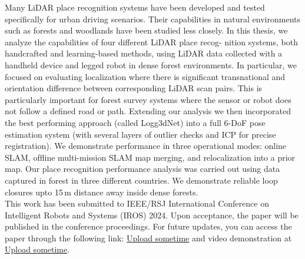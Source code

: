
Many LiDAR place recognition systems have been
developed and tested speciﬁcally for urban driving scenarios.
Their capabilities in natural environments such as forests and
woodlands have been studied less closely. In this thesis, we
analyze the capabilities of four different LiDAR place recog-
nition systems, both handcrafted and learning-based methods,
using LiDAR data collected with a handheld device and legged
robot in dense forest environments. In particular, we focused on
evaluating localization where there is signiﬁcant transnational
and orientation difference between corresponding LiDAR scan
pairs. This is particularly important for forest survey systems
where the sensor or robot does not follow a deﬁned road or
path. 
Extending our analysis we then incorporated the best
performing approach (called Logg3dNet) into a full 6-DoF pose
estimation system (with several layers of outlier checks and
ICP for precise registration). We demonstrate performance in
three operational modes: online SLAM, ofﬂine multi-mission
SLAM map merging, and relocalization into a prior map.
Our place recognition performance analysis was carried out
using data captured in forest in three different countries. We demonstrate reliable loop closures upto 15\,m distance away inside dense forests.  \\

This work has been submitted to IEEE/RSJ International Conference on Intelligent Robots and Systems (IROS) 2024. Upon acceptance, the paper will be published in the conference proceedings. For future updates, you can access the paper through the following link: \url{Upload sometime} and video demonstration at \url{Upload sometime}.